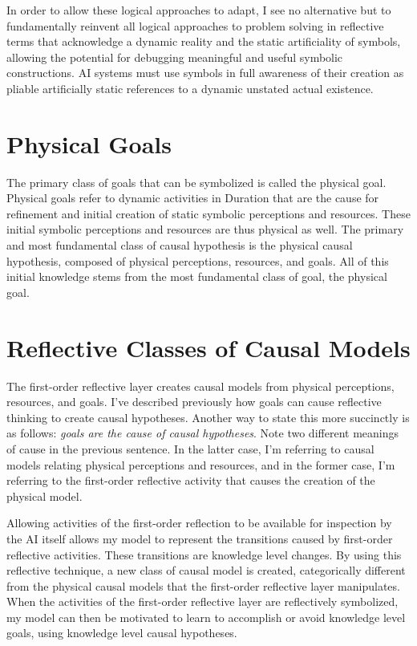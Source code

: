 In order to allow these logical approaches to adapt, I see no
alternative but to fundamentally reinvent all logical approaches to
problem solving in reflective terms that acknowledge a dynamic reality
and the static artificiality of symbols, allowing the potential for
debugging meaningful and useful symbolic constructions.  AI systems
must use symbols in full awareness of their creation as pliable
artificially static references to a dynamic unstated actual existence.

\section{Physical Goals}

The primary class of goals that can be symbolized is called the
physical goal.  Physical goals refer to dynamic activities in Duration
that are the cause for refinement and initial creation of static
symbolic perceptions and resources.  These initial symbolic
perceptions and resources are thus physical as well.  The primary and
most fundamental class of causal hypothesis is the physical causal
hypothesis, composed of physical perceptions, resources, and goals.
All of this initial knowledge stems from the most fundamental class of
goal, the physical goal.

\section{Reflective Classes of Causal Models}

The first-order reflective layer creates causal models from physical
perceptions, resources, and goals.  I've described previously how
goals can cause reflective thinking to create causal hypotheses.
Another way to state this more succinctly is as follows: \emph{goals
  are the cause of causal hypotheses}.  Note two different meanings of
cause in the previous sentence.  In the latter case, I'm referring to
causal models relating physical perceptions and resources, and in the
former case, I'm referring to the first-order reflective activity that
causes the creation of the physical model.

Allowing activities of the first-order reflection to be available for
inspection by the AI itself allows my model to represent the
transitions caused by first-order reflective activities.  These
transitions are knowledge level changes.  By using this reflective
technique, a new class of causal model is created, categorically
different from the physical causal models that the first-order
reflective layer manipulates.  When the activities of the first-order
reflective layer are reflectively symbolized, my model can then be
motivated to learn to accomplish or avoid knowledge level goals, using
knowledge level causal hypotheses.

